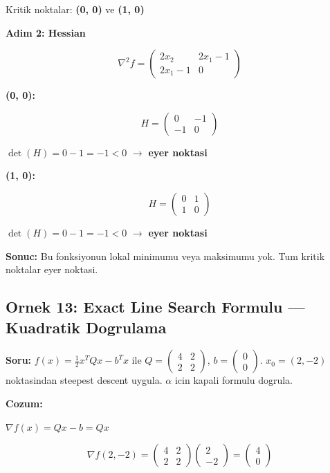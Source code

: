 \documentclass[12pt,a4paper]{article}
\theoremstyle{definition}
\theoremstyle{remark}
\begin{document}
Kritik noktalar: \textbf{(0, 0)} ve \textbf{(1, 0)}

\textbf{Adim 2: Hessian}

\[
\nabla^2 f = \begin{pmatrix} 2x_2 & 2x_1 - 1 \\ 2x_1 - 1 & 0 \end{pmatrix}
\]

\textbf{(0, 0):}

\[
H = \begin{pmatrix} 0 & -1 \\ -1 & 0 \end{pmatrix}
\]

$\det(H) = 0 - 1 = -1 < 0$ $\rightarrow$ \textbf{eyer noktasi}

\textbf{(1, 0):}

\[
H = \begin{pmatrix} 0 & 1 \\ 1 & 0 \end{pmatrix}
\]

$\det(H) = 0 - 1 = -1 < 0$ $\rightarrow$ \textbf{eyer noktasi}

\textbf{Sonuc:} Bu fonksiyonun lokal minimumu veya maksimumu yok. Tum kritik noktalar eyer noktasi.

\subsection{Ornek 13: Exact Line Search Formulu --- Kuadratik Dogrulama}

\textbf{Soru:} $f(x) = \frac{1}{2}x^T Q x - b^T x$ ile $Q = \begin{pmatrix} 4 & 2 \\ 2 & 2 \end{pmatrix}$, $b = \begin{pmatrix} 0 \\ 0 \end{pmatrix}$. $x_0 = (2, -2)$ noktasindan steepest descent uygula. $\alpha$ icin kapali formulu dogrula.

\bigskip
\textbf{Cozum:}

$\nabla f(x) = Qx - b = Qx$

\[
\nabla f(2,-2) = \begin{pmatrix} 4 & 2 \\ 2 & 2 \end{pmatrix} \begin{pmatrix} 2 \\ -2 \end{pmatrix} = \begin{pmatrix} 4 \\ 0 \end{pmatrix}
\]
\end{document}
